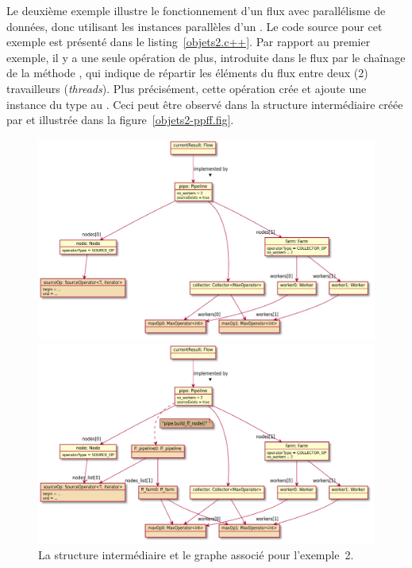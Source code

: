 Le deuxi\`eme exemple illustre le fonctionnement d'un flux avec parallélisme de données, donc utilisant les instances parall\`eles d'un . Le code source pour cet exemple est présenté dans le listing~\ref{objets2.c++}. Par rapport au premier exemple, il y a une seule op\'eration de plus, introduite dans le flux par le cha\^inage de la m\'ethode , qui indique de r\'epartir les \'el\'ements du flux entre deux (2) travailleurs (\emph{threads}). Plus précisément, cette op\'eration cr\'ee et ajoute une instance du type  au . Ceci peut \^etre observ\'e dans la structure interm\'ediaire cr\'e\'ee par  et illustr\'ee dans la figure~\ref{objets2-ppff.fig}.


\begin{figure}
\centering
         \includegraphics[width=1.0\textwidth]{Figures/objets2-ppff.pdf}
      \caption[La structure interm\'ediaire  pour l'exemple~2.]{La structure interm\'ediaire  pour 
         l'exemple~2~:.}
       \label{objets2-ppff.fig}

\centering
         \includegraphics[width=1.0\textwidth]{Figures/objets2-ff.pdf}
      \caption{La structure interm\'ediaire  et le graphe  associ\'e pour l'exemple~2.}
       \label{objets2-ff.fig}

\end{figure}




